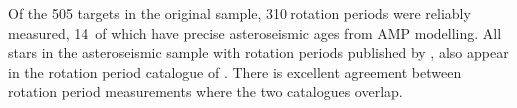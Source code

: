 \documentclass[10pt,preprint]{aastex}
\newcommand{\nastero}{310}
\newcommand{\nprecise}{14~}
\begin{document}
Of the 505 targets in the original sample, \nastero$~$rotation periods were reliably measured, \nprecise of which have precise asteroseismic ages from AMP modelling.
All stars in the asteroseismic sample with rotation periods published by \citet{McQuillan_2014}, also appear in the rotation period catalogue of \citet{Garcia2014}.
There is excellent agreement between rotation period measurements where the two catalogues overlap.
\end{document}

